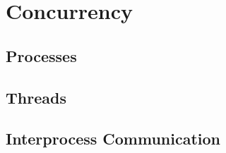 \chapter{\textbf{Concurrency}}

\section{Processes}

\section{Threads}

\section{Interprocess Communication}


